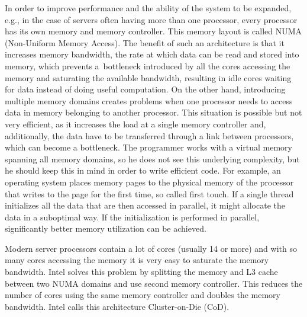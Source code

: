 In order to improve performance and the ability of the system to be expanded, e.g., in the case of servers often having more than one processor, every processor has its own memory and memory controller. This memory layout is called NUMA (Non-Uniform Memory Access). The benefit of such an architecture is that it increases memory bandwidth, the rate at which data can be read and stored into memory, which prevents a~bottleneck introduced by all the cores accessing the memory and saturating the available bandwidth, resulting in idle cores waiting for data instead of doing useful computation. On the other hand, introducing multiple memory domains creates problems when one processor needs to access data in memory belonging to another processor. This situation is possible but not very efficient, as it increases the load at a single memory controller and, additionally, the data have to be transferred through a link between processors, which can become a bottleneck. The programmer works with a virtual memory spanning all memory domains, so he does not see this underlying complexity, but he should keep this in mind in order to write efficient code. For example, an operating system places memory pages to the physical memory of the processor that writes to the page for the first time, so called first touch. If a single thread initializes all the data that are then accessed in parallel, it might allocate the data in a suboptimal way. If the initialization is performed in parallel, significantly better memory utilization can be achieved.

Modern server processors contain a lot of cores (usually 14 or more) and with so many cores accessing the memory it is very easy to saturate the memory bandwidth. Intel solves this problem by splitting the memory and L3 cache between two NUMA domains and use second memory controller. This reduces the number of cores using the same memory controller and doubles the memory bandwidth. Intel calls this architecture Cluster-on-Die (CoD).


